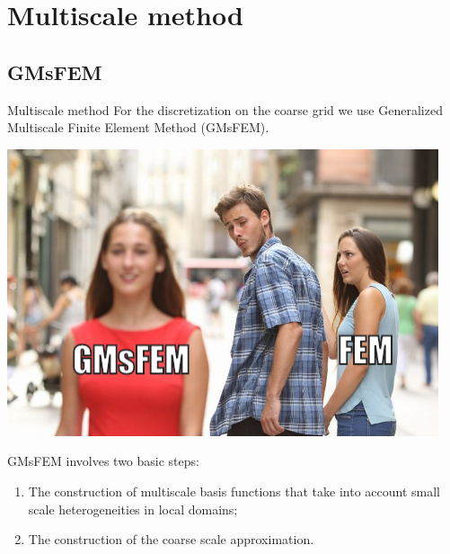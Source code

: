 \documentclass[10pt,pdf,hyperref={unicode}]{beamer}
\begin{document}
\section{Multiscale method}
\subsection{GMsFEM}
	\begin{frame}{Multiscale method}
		For the discretization on the coarse grid we use Generalized Multiscale Finite Element Method (GMsFEM).   
		
		\begin{center}
			\includegraphics[width=0.5\linewidth] {mmr.jpeg}
		\end{center}
		
		GMsFEM involves two basic steps: 
		\begin{enumerate}
			\item The construction of multiscale basis functions that take into account small scale heterogeneities in local domains;
			\item The construction of the coarse scale approximation.
		\end{enumerate}
	\end{frame}
\end{document}
